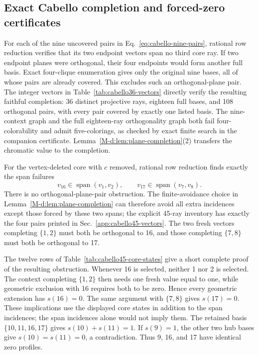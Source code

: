 \documentclass[aps,pra,reprint,superscriptaddress,longbibliography,nofootinbib,floatfix,10pt]{revtex4-2}
\theoremstyle{definition}
\begin{document}
\subsection{Exact Cabello completion and forced-zero certificates}
\label{app:cabello-proofs}
For each of the nine uncovered pairs in Eq.~\eqref{eq:cabello-nine-pairs},
rational row reduction verifies that its two endpoint vectors span
no third core ray. If two endpoint planes were orthogonal, their
four endpoints would form another full basis. Exact four-clique
enumeration gives only the original nine bases, all of whose pairs
are already covered. This excludes such an orthogonal-plane pair.
The integer vectors in Table~\ref{tab:cabello36-vectors} directly
verify the resulting faithful completion: 36 distinct projective
rays, eighteen full bases, and 108 orthogonal pairs, with every pair
covered by exactly one listed basis. The nine-context graph and the
full eighteen-ray orthogonality graph both fail four-colorability
and admit five-colorings, as checked by exact finite search in the
companion certificate. Lemma~\ref{M-d:lem:plane-completion}(2) transfers
the chromatic value to the completion.

For the vertex-deleted core with $c$ removed, rational row reduction
finds exactly the span failures
\[
v_{16}\in\operatorname{span}(v_1,v_2),\qquad
v_{17}\in\operatorname{span}(v_7,v_8).
\]
There is no orthogonal-plane-pair obstruction. The finite-avoidance
choice in Lemma~\ref{M-d:lem:plane-completion} can therefore avoid all
extra incidences except those forced by these two spans; the explicit
45-ray inventory has exactly the four pairs printed in Sec.~\ref{app:cabello45-vectors}.
The two fresh vectors completing $\{1,2\}$ must both be orthogonal
to 16, and those completing $\{7,8\}$ must both be orthogonal to 17.

The twelve rows of Table~\ref{tab:cabello45-core-states} give a short
complete proof of the resulting obstruction. Whenever 16 is selected,
neither 1 nor 2 is selected. The context completing $\{1,2\}$ then
needs one fresh value equal to one, while geometric exclusion with
16 requires both to be zero. Hence every geometric extension has
$s(16)=0$. The same argument with $\{7,8\}$ gives $s(17)=0$.
These implications use the displayed core states in addition to the
span incidences; the span incidences alone would not imply them.
The retained basis $\{10,11,16,17\}$ gives $s(10)+s(11)=1$.
If $s(9)=1$, the other two hub bases give $s(10)=s(11)=0$, a
contradiction. Thus 9, 16, and 17 have identical zero profiles.
\end{document}
